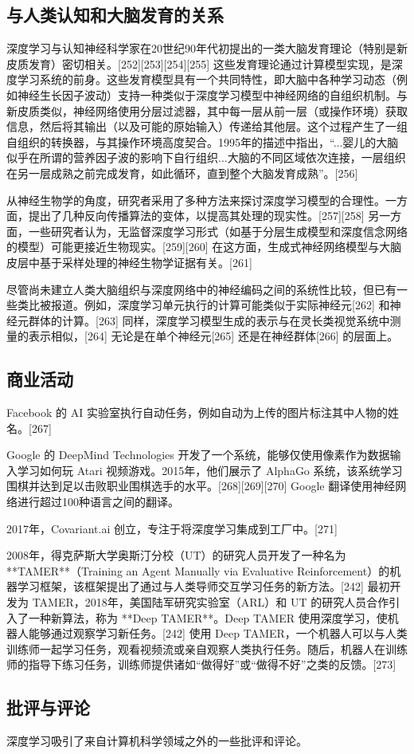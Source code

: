 \subsection{与人类认知和大脑发育的关系}  
深度学习与认知神经科学家在20世纪90年代初提出的一类大脑发育理论（特别是新皮质发育）密切相关。[252][253][254][255] 这些发育理论通过计算模型实现，是深度学习系统的前身。这些发育模型具有一个共同特性，即大脑中各种学习动态（例如神经生长因子波动）支持一种类似于深度学习模型中神经网络的自组织机制。与新皮质类似，神经网络使用分层过滤器，其中每一层从前一层（或操作环境）获取信息，然后将其输出（以及可能的原始输入）传递给其他层。这个过程产生了一组自组织的转换器，与其操作环境高度契合。1995年的描述中指出，“...婴儿的大脑似乎在所谓的营养因子波的影响下自行组织...大脑的不同区域依次连接，一层组织在另一层成熟之前完成发育，如此循环，直到整个大脑发育成熟”。[256]  

从神经生物学的角度，研究者采用了多种方法来探讨深度学习模型的合理性。一方面，提出了几种反向传播算法的变体，以提高其处理的现实性。[257][258] 另一方面，一些研究者认为，无监督深度学习形式（如基于分层生成模型和深度信念网络的模型）可能更接近生物现实。[259][260] 在这方面，生成式神经网络模型与大脑皮层中基于采样处理的神经生物学证据有关。[261]  

尽管尚未建立人类大脑组织与深度网络中的神经编码之间的系统性比较，但已有一些类比被报道。例如，深度学习单元执行的计算可能类似于实际神经元[262] 和神经元群体的计算。[263] 同样，深度学习模型生成的表示与在灵长类视觉系统中测量的表示相似，[264] 无论是在单个神经元[265] 还是在神经群体[266] 的层面上。
\subsection{商业活动}  
Facebook 的 AI 实验室执行自动任务，例如自动为上传的图片标注其中人物的姓名。[267]  

Google 的 DeepMind Technologies 开发了一个系统，能够仅使用像素作为数据输入学习如何玩 Atari 视频游戏。2015年，他们展示了 AlphaGo 系统，该系统学习围棋并达到足以击败职业围棋选手的水平。[268][269][270] Google 翻译使用神经网络进行超过100种语言之间的翻译。  

2017年，Covariant.ai 创立，专注于将深度学习集成到工厂中。[271]  

2008年，得克萨斯大学奥斯汀分校（UT）的研究人员开发了一种名为 **TAMER**（Training an Agent Manually via Evaluative Reinforcement）的机器学习框架，该框架提出了通过与人类导师交互学习任务的新方法。[242] 最初开发为 TAMER，2018年，美国陆军研究实验室（ARL）和 UT 的研究人员合作引入了一种新算法，称为 **Deep TAMER**。Deep TAMER 使用深度学习，使机器人能够通过观察学习新任务。[242] 使用 Deep TAMER，一个机器人可以与人类训练师一起学习任务，观看视频流或亲自观察人类执行任务。随后，机器人在训练师的指导下练习任务，训练师提供诸如“做得好”或“做得不好”之类的反馈。[273]  
\subsection{批评与评论}  
深度学习吸引了来自计算机科学领域之外的一些批评和评论。